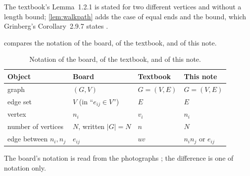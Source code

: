 The textbook's Lemma~1.2.1 is stated for two different vertices and without a length bound; \cref{lem:walkpath} adds the case of equal ends and the bound, which Grinberg's Corollary~2.9.7 states \cite{grinberg2025graph}.

 compares the notation of the board, of the textbook, and of this note.

\begin{table}[ht]
\centering
\caption{Notation of the board, of the textbook, and of this note.}\label{tab:notation}
\begin{tabular}{llll}
\toprule
Object & Board & Textbook & This note\\
\midrule
graph & $(G,V)$ & $G=(V,E)$ & $G=(V,E)$\\
edge set & $V$ (in ``$e_{ij}\in V$'') & $E$ & $E$\\
vertex & $n_i$ & $v_i$ & $n_i$\\
number of vertices & $N$, written $|G|=N$ & $n$ & $N$\\
edge between $n_i,n_j$ & $e_{ij}$ & $uv$ & $n_in_j$ or $e_{ij}$\\
\bottomrule
\end{tabular}
\end{table}

The board's notation is read from the photographs \cite{whiteboard1,whiteboard2}; the difference is one of notation only.
